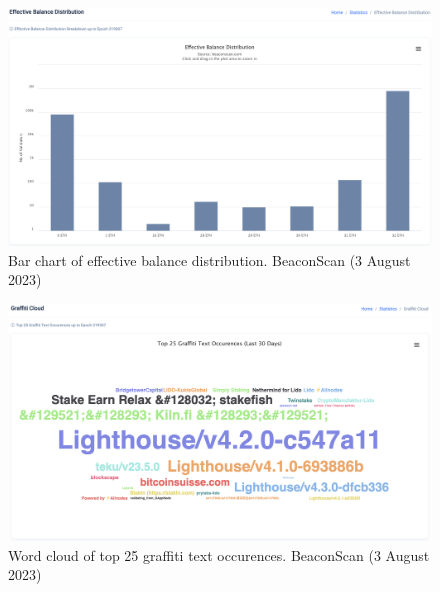 \documentclass[UTF8]{article}
\begin{document}
{\begin{figure}[htbp]
\begin{center}
\includegraphics[width=\linewidth]{images/beaconscan16}
\caption{Bar chart of effective balance distribution. BeaconScan (3 August 2023)}
\label{fig:beaconscan16}
\end{center}
\end{figure}

\begin{figure}[htbp]
\begin{center}
\includegraphics[width=\linewidth]{images/beaconscan17}
\caption{Word cloud of top 25 graffiti text occurences. BeaconScan (3 August 2023)}
\label{fig:beaconscan17}
\end{center}
\end{figure}

}
\end{document}
